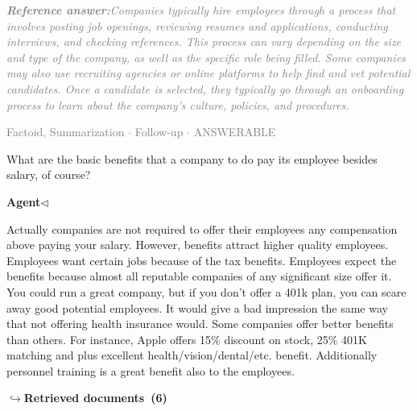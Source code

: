 \documentclass[a4paper,11pt]{article}
\begin{document}
\begin{refanswerenv}
{\footnotesize\textit{\textcolor{gray}{\textbf{Reference answer:}\enspace Companies typically hire employees through a process that involves posting job openings, reviewing resumes and applications, conducting interviews, and checking references. This process can vary depending on the size and type of the company, as well as the specific role being filled. Some companies may also use recruiting agencies or online platforms to help find and vet potential candidates. Once a candidate is selected, they typically go through an onboarding process to learn about the company's culture, policies, and procedures.}}}
\end{refanswerenv}
\vspace{0.5em}
\hfill{\tiny\textcolor{gray}{Factoid, Summarization $\cdot$ Follow-up $\cdot$ ANSWERABLE}}
\begin{userbubble}
What are the basic benefits that a company to do pay its employee besides salary, of course?
\end{userbubble}
\noindent\hfill{\small\textcolor{agentcolor}{\textbf{Agent\enspace$\triangleleft$}}}
\begin{agentbubble}
Actually  companies are not required to offer their employees any compensation above paying your salary. However, benefits attract higher quality employees.  Employees want certain jobs because of the tax benefits. Employees expect  the benefits because almost all reputable companies of any significant size offer it. You could run a great company, but if you don't offer a 401k plan, you can scare away good potential employees. It would give a bad impression the same way that not offering health insurance would. Some companies offer better benefits than others. For instance,  Apple offers 15\% discount on stock, 25\% 401K matching and plus excellent health/vision/dental/etc. benefit. Additionally personnel training  is a great benefit also to the employees.    
\end{agentbubble}
\noindent\hfill{\footnotesize\textcolor{doccolor}{\textbf{$\hookrightarrow$\enspace Retrieved documents~(6)}}}
\end{document}
